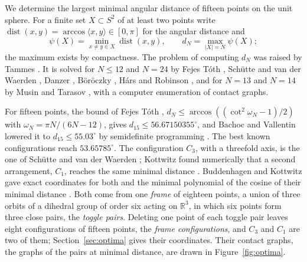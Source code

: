 \documentclass[12pt]{amsart}
\theoremstyle{definition}
\theoremstyle{plain}
\theoremstyle{definition}
\newcommand{\R}{\mathbb{R}}
\newcommand{\Sph}{S^2}
\newcommand{\dist}{\operatorname{dist}}
\newcommand{\CI}{C_1}
\newcommand{\CIII}{C_3}
\begin{document}
We determine the largest minimal angular distance of fifteen points on the unit sphere. For a finite set $X\subset\Sph$ of at least two points write $\dist(x,y)=\arccos\langle x,y\rangle\in[0,\pi]$ for the angular distance and
\[
\psi(X)=\min_{x\ne y\in X}\dist(x,y),\qquad d_N=\max_{|X|=N}\psi(X);
\]
the maximum exists by compactness. The problem of computing $d_N$ was raised by Tammes \cite{Tam}. It is solved for $N\le 12$ and $N=24$ by Fejes T\'oth \cite{FT43}, Sch\"utte and van der Waerden \cite{SvdW}, Danzer \cite{Dan}, B\"or\"oczky \cite{Bor11}, H\'ars \cite{Har} and Robinson \cite{Rob}, and for $N=13$ and $N=14$ by Musin and Tarasov \cite{MT13,MT14}, with a computer enumeration of contact graphs.

For fifteen points, the bound of Fejes T\'oth \cite{FT43}, $d_N\le\arccos((\cot^2\omega_N-1)/2)$ with $\omega_N=\pi N/(6N-12)$, gives $d_{15}\le56.67150355^\circ$, and Bachoc and Vallentin lowered it to $d_{15}\le55.03^\circ$ by semidefinite programming \cite[Table~5.3]{BV}. The best known configurations reach $53.65785^\circ$. The configuration $\CIII$, with a threefold axis, is the one of Sch\"utte and van der Waerden \cite[Section~17, Fig.~59]{SvdW}; Kottwitz found numerically that a second arrangement, $\CI$, reaches the same minimal distance \cite[Section~5, Fig.~2]{Kot}. Buddenhagen and Kottwitz gave exact coordinates for both and the minimal polynomial of the cosine of their minimal distance \cite[Section~4 and Table~1]{BK}. Both come from one \emph{frame} of eighteen points, a union of three orbits of a dihedral group of order six acting on $\R^3$, in which six points form three close pairs, the \emph{toggle pairs}. Deleting one point of each toggle pair leaves eight configurations of fifteen points, the \emph{frame configurations}, and $\CIII$ and $\CI$ are two of them; Section~\ref{sec:optima} gives their coordinates. Their contact graphs, the graphs of the pairs at minimal distance, are drawn in Figure~\ref{fig:optima}.
\end{document}
